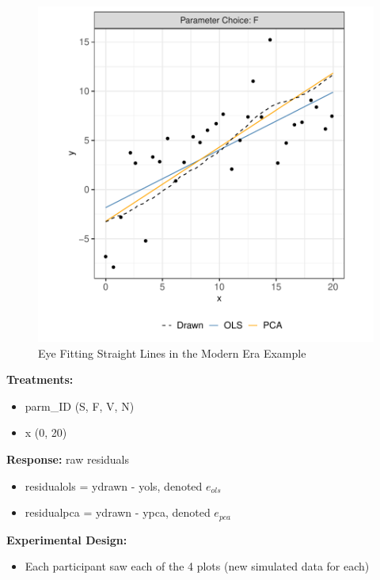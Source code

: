 \documentclass[print]{nuthesis}
\providecommand{\tightlist}{%
  \setlength{\itemsep}{0pt}\setlength{\parskip}{0pt}}
\begin{document}
\begin{figure}[tbp]

{\centering \includegraphics[width=1\linewidth,]{thesis_files/figure-latex/eyefitting-example-plot-1} 

}

\caption{Eye Fitting Straight Lines in the Modern Era Example}\label{fig:eyefitting-example-plot}
\end{figure}

\textbf{Treatments:}

\begin{itemize}
\tightlist
\item
  parm\_ID (S, F, V, N)
\item
  x (0, 20)
\end{itemize}

\textbf{Response:} raw residuals

\begin{itemize}
\tightlist
\item
  residualols = ydrawn - yols, denoted \(e_{ols}\)
\item
  residualpca = ydrawn - ypca, denoted \(e_{pca}\)
\end{itemize}

\textbf{Experimental Design:}

\begin{itemize}
\tightlist
\item
  Each participant saw each of the 4 plots (new simulated data for each)
\end{itemize}
\end{document}
